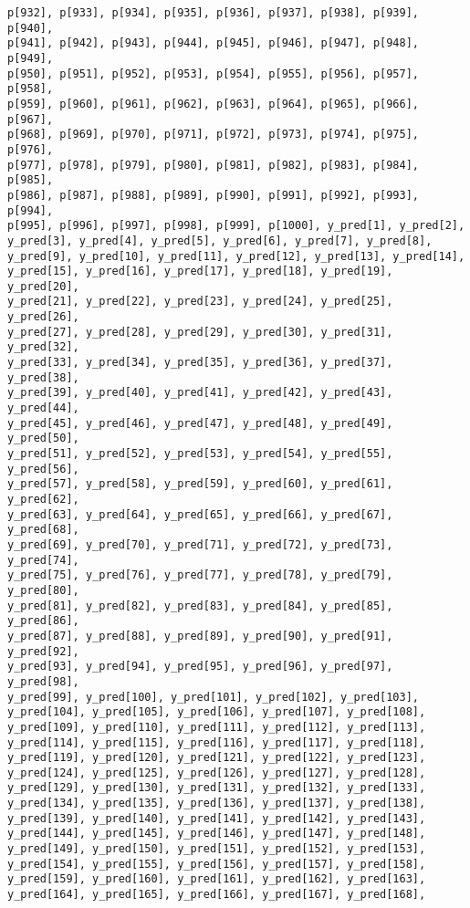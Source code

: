 \documentclass[
  letterpaper,
  DIV=11,
  numbers=noendperiod]{scrartcl}
\begin{document}
\begin{verbatim}
p[932], p[933], p[934], p[935], p[936], p[937], p[938], p[939], p[940],
p[941], p[942], p[943], p[944], p[945], p[946], p[947], p[948], p[949],
p[950], p[951], p[952], p[953], p[954], p[955], p[956], p[957], p[958],
p[959], p[960], p[961], p[962], p[963], p[964], p[965], p[966], p[967],
p[968], p[969], p[970], p[971], p[972], p[973], p[974], p[975], p[976],
p[977], p[978], p[979], p[980], p[981], p[982], p[983], p[984], p[985],
p[986], p[987], p[988], p[989], p[990], p[991], p[992], p[993], p[994],
p[995], p[996], p[997], p[998], p[999], p[1000], y_pred[1], y_pred[2],
y_pred[3], y_pred[4], y_pred[5], y_pred[6], y_pred[7], y_pred[8],
y_pred[9], y_pred[10], y_pred[11], y_pred[12], y_pred[13], y_pred[14],
y_pred[15], y_pred[16], y_pred[17], y_pred[18], y_pred[19], y_pred[20],
y_pred[21], y_pred[22], y_pred[23], y_pred[24], y_pred[25], y_pred[26],
y_pred[27], y_pred[28], y_pred[29], y_pred[30], y_pred[31], y_pred[32],
y_pred[33], y_pred[34], y_pred[35], y_pred[36], y_pred[37], y_pred[38],
y_pred[39], y_pred[40], y_pred[41], y_pred[42], y_pred[43], y_pred[44],
y_pred[45], y_pred[46], y_pred[47], y_pred[48], y_pred[49], y_pred[50],
y_pred[51], y_pred[52], y_pred[53], y_pred[54], y_pred[55], y_pred[56],
y_pred[57], y_pred[58], y_pred[59], y_pred[60], y_pred[61], y_pred[62],
y_pred[63], y_pred[64], y_pred[65], y_pred[66], y_pred[67], y_pred[68],
y_pred[69], y_pred[70], y_pred[71], y_pred[72], y_pred[73], y_pred[74],
y_pred[75], y_pred[76], y_pred[77], y_pred[78], y_pred[79], y_pred[80],
y_pred[81], y_pred[82], y_pred[83], y_pred[84], y_pred[85], y_pred[86],
y_pred[87], y_pred[88], y_pred[89], y_pred[90], y_pred[91], y_pred[92],
y_pred[93], y_pred[94], y_pred[95], y_pred[96], y_pred[97], y_pred[98],
y_pred[99], y_pred[100], y_pred[101], y_pred[102], y_pred[103],
y_pred[104], y_pred[105], y_pred[106], y_pred[107], y_pred[108],
y_pred[109], y_pred[110], y_pred[111], y_pred[112], y_pred[113],
y_pred[114], y_pred[115], y_pred[116], y_pred[117], y_pred[118],
y_pred[119], y_pred[120], y_pred[121], y_pred[122], y_pred[123],
y_pred[124], y_pred[125], y_pred[126], y_pred[127], y_pred[128],
y_pred[129], y_pred[130], y_pred[131], y_pred[132], y_pred[133],
y_pred[134], y_pred[135], y_pred[136], y_pred[137], y_pred[138],
y_pred[139], y_pred[140], y_pred[141], y_pred[142], y_pred[143],
y_pred[144], y_pred[145], y_pred[146], y_pred[147], y_pred[148],
y_pred[149], y_pred[150], y_pred[151], y_pred[152], y_pred[153],
y_pred[154], y_pred[155], y_pred[156], y_pred[157], y_pred[158],
y_pred[159], y_pred[160], y_pred[161], y_pred[162], y_pred[163],
y_pred[164], y_pred[165], y_pred[166], y_pred[167], y_pred[168],

\end{verbatim}
\end{document}
